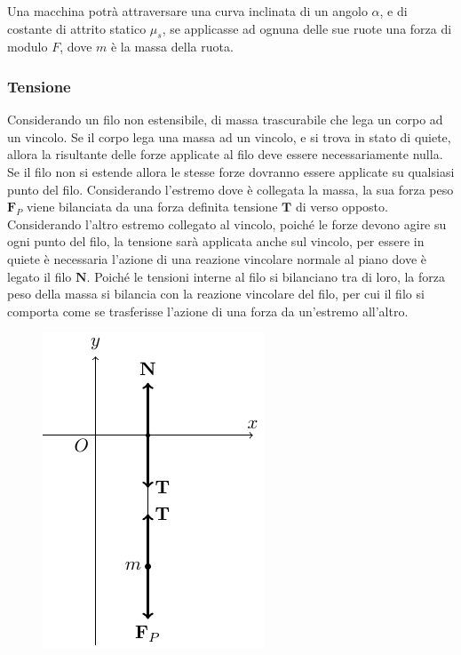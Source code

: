 \documentclass{article}
\newcommand{\vect}[1]{\boldsymbol{\mathbf{#1}}}
\numberwithin{equation}{subsection}
\begin{document}
Una macchina potrà attraversare una curva inclinata di un angolo $\alpha$, e di costante di attrito statico $\mu_s$, se applicasse ad ognuna delle sue ruote una 
forza di modulo $F$, dove $m$ è la massa della ruota.

\subsubsection{Tensione}
Considerando un filo non estensibile, di massa trascurabile che 
lega un corpo ad un vincolo. Se il corpo lega una massa ad un vincolo, e si trova in stato di quiete, allora la risultante delle forze applicate al filo deve essere 
necessariamente nulla. Se il filo non si estende allora le stesse forze dovranno essere applicate su qualsiasi punto del filo. Considerando l'estremo dove è collegata 
la massa, la sua forza peso $\vect{F}_P$ viene bilanciata da una forza definita tensione $\vect{T}$ di verso opposto. Considerando l'altro estremo collegato al vincolo, poiché 
le forze devono agire su ogni punto del filo, la tensione sarà applicata anche sul vincolo, per essere in quiete è necessaria l'azione di una reazione vincolare normale al piano 
dove è legato il filo $\vect{N}$. Poiché le tensioni interne al filo si bilanciano tra di loro, la forza peso della massa si bilancia con la reazione vincolare del filo, per cui 
il filo si comporta come se trasferisse l'azione di una forza da un'estremo all'altro. 

\begin{figure}[H]%
    \centering
    \includegraphics{tensione.pdf}%
\end{figure}
\end{document}
